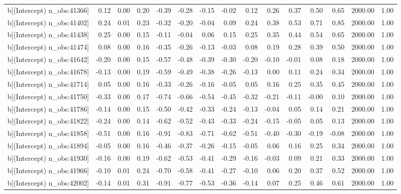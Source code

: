\begin{table}[ht]
\begin{tabular}{rrrrrrrrrrrrrrr}
  b[(Intercept) n\_obs:41366] & 0.12 & 0.00 & 0.20 & -0.39 & -0.28 & -0.15 & -0.02 & 0.12 & 0.26 & 0.37 & 0.50 & 0.65 & 2000.00 & 1.00 \\ 
  b[(Intercept) n\_obs:41402] & 0.24 & 0.01 & 0.23 & -0.32 & -0.20 & -0.04 & 0.09 & 0.24 & 0.38 & 0.53 & 0.71 & 0.85 & 2000.00 & 1.00 \\ 
  b[(Intercept) n\_obs:41438] & 0.25 & 0.00 & 0.15 & -0.11 & -0.04 & 0.06 & 0.15 & 0.25 & 0.35 & 0.44 & 0.54 & 0.65 & 2000.00 & 1.00 \\ 
  b[(Intercept) n\_obs:41474] & 0.08 & 0.00 & 0.16 & -0.35 & -0.26 & -0.13 & -0.03 & 0.08 & 0.19 & 0.28 & 0.39 & 0.50 & 2000.00 & 1.00 \\ 
  b[(Intercept) n\_obs:41642] & -0.20 & 0.00 & 0.15 & -0.57 & -0.48 & -0.39 & -0.30 & -0.20 & -0.10 & -0.01 & 0.08 & 0.18 & 2000.00 & 1.00 \\ 
  b[(Intercept) n\_obs:41678] & -0.13 & 0.00 & 0.19 & -0.59 & -0.49 & -0.38 & -0.26 & -0.13 & 0.00 & 0.11 & 0.24 & 0.34 & 2000.00 & 1.00 \\ 
  b[(Intercept) n\_obs:41714] & 0.05 & 0.00 & 0.16 & -0.33 & -0.26 & -0.16 & -0.05 & 0.05 & 0.16 & 0.25 & 0.35 & 0.45 & 2000.00 & 1.00 \\ 
  b[(Intercept) n\_obs:41750] & -0.33 & 0.00 & 0.17 & -0.74 & -0.66 & -0.54 & -0.45 & -0.32 & -0.21 & -0.11 & -0.00 & 0.10 & 2000.00 & 1.00 \\ 
  b[(Intercept) n\_obs:41786] & -0.14 & 0.00 & 0.15 & -0.50 & -0.42 & -0.33 & -0.24 & -0.13 & -0.04 & 0.05 & 0.14 & 0.21 & 2000.00 & 1.00 \\ 
  b[(Intercept) n\_obs:41822] & -0.24 & 0.00 & 0.14 & -0.62 & -0.52 & -0.43 & -0.33 & -0.24 & -0.15 & -0.05 & 0.05 & 0.13 & 2000.00 & 1.00 \\ 
  b[(Intercept) n\_obs:41858] & -0.51 & 0.00 & 0.16 & -0.91 & -0.83 & -0.71 & -0.62 & -0.51 & -0.40 & -0.30 & -0.19 & -0.08 & 2000.00 & 1.00 \\ 
  b[(Intercept) n\_obs:41894] & -0.05 & 0.00 & 0.16 & -0.46 & -0.37 & -0.26 & -0.15 & -0.05 & 0.06 & 0.16 & 0.25 & 0.34 & 2000.00 & 1.00 \\ 
  b[(Intercept) n\_obs:41930] & -0.16 & 0.00 & 0.19 & -0.62 & -0.53 & -0.41 & -0.29 & -0.16 & -0.03 & 0.09 & 0.21 & 0.33 & 2000.00 & 1.00 \\ 
  b[(Intercept) n\_obs:41966] & -0.10 & 0.01 & 0.24 & -0.70 & -0.58 & -0.41 & -0.27 & -0.10 & 0.06 & 0.20 & 0.37 & 0.52 & 2000.00 & 1.00 \\ 
  b[(Intercept) n\_obs:42002] & -0.14 & 0.01 & 0.31 & -0.91 & -0.77 & -0.53 & -0.36 & -0.14 & 0.07 & 0.25 & 0.46 & 0.61 & 2000.00 & 1.00 \\ 

\end{tabular}
\end{table}
